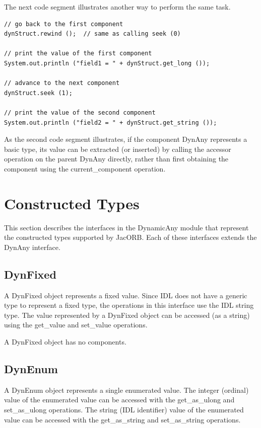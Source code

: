 The next code segment illustrates another way to perform the same
task.

\begin{small}
\begin{verbatim}
// go back to the first component
dynStruct.rewind ();  // same as calling seek (0)

// print the value of the first component
System.out.println ("field1 = " + dynStruct.get_long ());

// advance to the next component
dynStruct.seek (1);

// print the value of the second component
System.out.println ("field2 = " + dynStruct.get_string ());

\end{verbatim}
\end{small}

As the second code segment illustrates, if the component DynAny
represents a basic type, its value can be extracted (or inserted) by
calling the accessor operation on the parent DynAny directly, rather
than first obtaining the component using the current\_component
operation.

\section{Constructed Types}

This section describes the interfaces in the DynamicAny module that
represent the constructed types supported by JacORB.  Each of these
interfaces extends the DynAny interface.



\subsection{DynFixed}

A DynFixed object represents a fixed value.  Since IDL does not have
a generic type to represent a fixed type, the operations in this
interface use the IDL string type.  The value represented by a
DynFixed object can be accessed (as a string) using the get\_value
and set\_value operations.

A DynFixed object has no components.

\subsection{DynEnum}

A DynEnum object represents a single enumerated value.  The integer
(ordinal) value of the enumerated value can be accessed with the
get\_as\_ulong and set\_as\_ulong operations.  The string (IDL
identifier) value of the enumerated value can be accessed with the
get\_as\_string and set\_as\_string operations.

